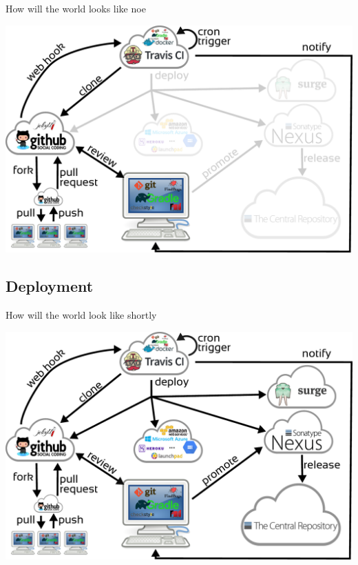 \documentclass[presentation]{beamer}
\begin{document}
\begin{frame}[fragile]{How will the world looks like noe}
	\begin{center}
		\includegraphics[width=.9\textwidth]{images/ci-travis}
	\end{center}
\end{frame}

\subsection{Deployment}

\begin{frame}[fragile]{How will the world look like shortly}
	\begin{center}
		\includegraphics[width=.9\textwidth]{images/ci}
	\end{center}
\end{frame}
\end{document}

